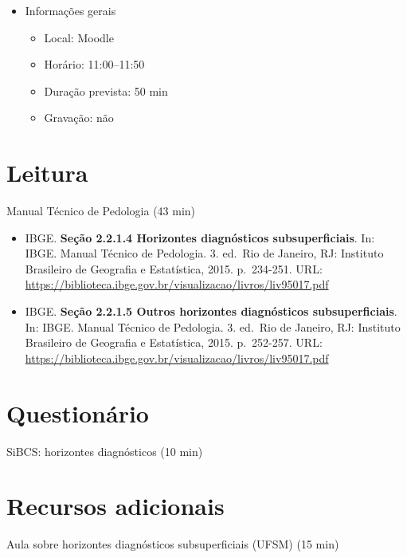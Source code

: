 \documentclass[
  11pt,
  a4paper,
  dvipsnames]{tufte-book}
\providecommand{\tightlist}{%
  \setlength{\itemsep}{0pt}\setlength{\parskip}{0pt}}
\begin{document}
\begin{itemize}
\tightlist
\item
  Informações gerais

  \begin{itemize}
  \tightlist
  \item
    Local: Moodle
  \item
    Horário: 11:00--11:50
  \item
    Duração prevista: 50 min
  \item
    Gravação: não
  \end{itemize}
\end{itemize}

\hypertarget{leitura-6}{%
\section{Leitura}\label{leitura-6}}

Manual Técnico de Pedologia (43 min)

\begin{itemize}
\tightlist
\item
  IBGE. \textbf{Seção 2.2.1.4 Horizontes diagnósticos subsuperficiais}. In: IBGE. Manual Técnico de Pedologia. 3. ed.~Rio de Janeiro, RJ: Instituto Brasileiro de Geografia e Estatística, 2015. p.~234-251. URL: \url{https://biblioteca.ibge.gov.br/visualizacao/livros/liv95017.pdf}
\item
  IBGE. \textbf{Seção 2.2.1.5 Outros horizontes diagnósticos subsuperficiais}. In: IBGE. Manual Técnico de Pedologia. 3. ed.~Rio de Janeiro, RJ: Instituto Brasileiro de Geografia e Estatística, 2015. p.~252-257. URL: \url{https://biblioteca.ibge.gov.br/visualizacao/livros/liv95017.pdf}
\end{itemize}

\hypertarget{questionuxe1rio-6}{%
\section{Questionário}\label{questionuxe1rio-6}}

SiBCS: horizontes diagnósticos (10 min)

\hypertarget{recursos-adicionais-4}{%
\section{Recursos adicionais}\label{recursos-adicionais-4}}

Aula sobre horizontes diagnósticos subsuperficiais (UFSM) (15 min)
\end{document}
